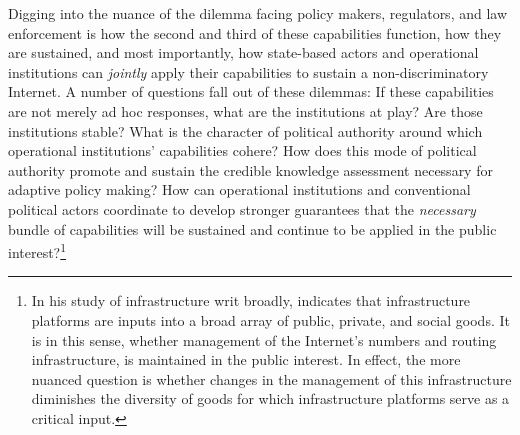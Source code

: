 \documentclass[12pt,journal,compsoc,letterpaper,onecolumn,twoside]{IEEEtran}
\begin{document}
Digging into the nuance of the dilemma facing policy makers, regulators, and law enforcement 
is how the second and third
of these capabilities function, how
they are sustained, and most importantly,
how  state-based actors and operational institutions can \emph{jointly} apply
their capabilities to sustain a non-discriminatory Internet.
%
A number of questions fall out of these dilemmas:
%
If these capabilities are not merely ad hoc responses, what are the
institutions at play?
%
Are those institutions stable?
%
What is the character of political authority around which operational
institutions' capabilities cohere?
%
How does this mode of political authority promote and sustain the
credible knowledge assessment necessary for adaptive policy making?
%
How can operational institutions and conventional political actors
coordinate to develop stronger guarantees that 
the \emph{necessary} bundle of capabilities will be sustained and
continue to be applied in the public interest?\footnote{In his study
  of infrastructure writ broadly, 
  indicates that infrastructure platforms are inputs into a broad
  array of public, private, and social goods.  It is in this sense,
  whether management of the Internet's numbers and routing
  infrastructure, is maintained in the public interest.  In effect,
  the more nuanced question is whether changes in the management of
  this infrastructure diminishes the diversity of goods for which
  infrastructure platforms serve as a critical input.}
\end{document}
